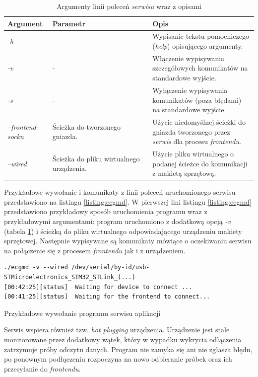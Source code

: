 \begin{table}[h!]
\centering
    \caption{Argumenty linii poleceń \textit{serwisu} wraz z opisami}
\label{tab:daemon-cmd-args}
    \begin{tabular}{|p{0.18\linewidth}|p{0.4\linewidth}|p{0.42\linewidth}|}
\hline
    \textbf{Argument} & \textbf{Parametr} & \textbf{Opis}        \\ \hline
    \textit{-h} & - & Wypisanie tekstu pomocniczego (\textit{help}) opisującego argumenty.\\ \hline
    \textit{-v} & - & Włączenie wypisywania szczegółowych komunikatów na standardowe wyjście.   \\ \hline
    \textit{-s} & - & Wyłączenie wypisywania komunikatów (poza błędami) na standardowe wyjście. \\ \hline
    \textit{--frontend-sockn} & Ścieżka do tworzonego gniazda. & Użycie niedomyślnej ścieżki do gniazda tworzonego przez \textit{serwis} dla procesu \textit{frontendu}. \\ \hline
    \textit{--wired} & Ścieżka do pliku wirtualnego urządzenia. & Użycie pliku wirtualnego o podanej ścieżce do komunikacji z makietą sprzętową. \\ \hline
\end{tabular}
\end{table}

Przykładowe wywołanie i komunikaty z linii poleceń uruchomionego serwisu przedstawiono na listingu \ref{listing:ecgmd}.
W pierwszej lini listingu \ref{listing:ecgmd} przedstawiono przykładowy sposób uruchomienia programu wraz z przykładowymi
argumentami: program uruchomiono z dodatkową opcją \textit{-v} (tabela \ref{tab:daemon-cmd-args}) i ścieżką do pliku wirtualnego
odpowiadającego urządzeniu makiety sprzętowej. Następnie wypisywane są komunikaty mówiące o oczekiwaniu serwisu na połączenie
się z procesem \textit{frontendu} jak i z urządzeniem.

\begin{listing}
\begin{verbatim}
./ecgmd -v --wired /dev/serial/by-id/usb-STMicroelectronics_STM32_STLink_(...)
[00:42:25][status] 	Waiting for device to connect ...
[00:41:25][status] 	Waiting for the frontend to connect...
\end{verbatim}
    \caption{Przykładowe wywołanie programu serwisu aplikacji}
\label{listing:ecgmd}
\end{listing}

Serwis wspiera również tzw. \textit{hot plugging} urządzenia. Urządzenie jest stale
monitorowane przez dodatkowy wątek, który w wypadku wykrycia odłączenia zatrzymuje próby odczytu danych.
Program nie zamyka się ani nie zgłasza błędu, po ponownym podłączeniu rozpoczyna na nowo odbieranie
próbek oraz ich przesyłanie do \textit{frontendu}.

